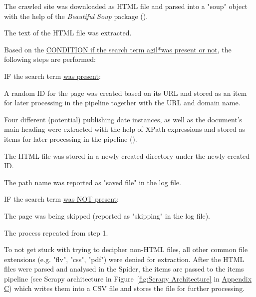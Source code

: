 \begin{compactenum}
    \setlength
    \itemsep{0em}
        \item The crawled site was downloaded as HTML file and parsed into a "soup" object with the help of the \textit{Beautiful Soup} package (\cite{Richardson2007}).
        \item The text of the HTML file was extracted.
        \item Based on the \underline{CONDITION if the search term agil*\footnotemark  was present or not}, the following steps are performed: 
        \begin{compactenum}
            \item IF the search term \underline{was present}:
            \begin{compactenum}
                \item A random ID for the page was created  based on its URL and stored as an item for later processing in the pipeline together with the URL and domain name.
                \item Four different (potential) publishing date instances, as well as the document's main heading were extracted with the help of XPath expressions and stored as items for later processing in the pipeline (\cite{W3schools.com2020}).
                \item The HTML file was stored in a newly created directory under the newly created ID.
                \item The path name was reported as "saved file" in the log file. 
            \end{compactenum}
            \item IF the search term \underline{was NOT present}:
            \begin{compactenum}
                \item The page was being skipped (reported as "skipping" in the log file).
            \end{compactenum}
        \end{compactenum}
        \item The process repeated from step 1. 
\end{compactenum}
To not get stuck with trying to decipher non-HTML files, all other common file extensions (e.g. "flv", "css", "pdf") were denied for extraction. After the HTML files were parsed and analysed in the Spider, the items are passed to the items pipeline (see Scrapy architecture in Figure~\ref{fig:Scrapy Architecture} in \href{Appendix C}{Appendix C}) which writes them into a CSV file and stores the file for further processing.

